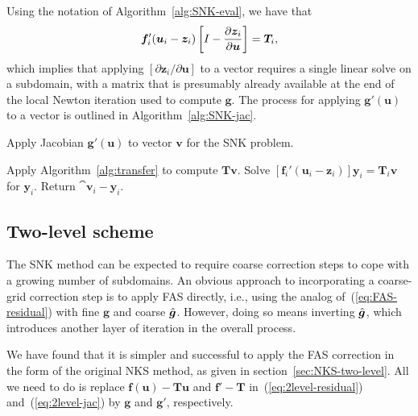 Using the notation of Algorithm~\ref{alg:SNK-eval}, we have that
\[
  \bm{f}_i'(\bm{u}_i-\bm{z}_i) \left[I - \frac{\partial \bm{z}_i}{\partial \bm{u}} \right] = \bm{T}_i,
\]
which implies that applying $[\partial \bm{z}_i/\partial \bm{u}]$ to a vector requires a single linear solve on a subdomain, with a matrix that is presumably already available at the end of the local Newton iteration used to compute $\bm{g}$. The process for applying $\bm{g}'(\bm{u})$ to a vector is outlined in Algorithm~\ref{alg:SNK-jac}. 
\begin{algorithm}
  \caption{Apply Jacobian $\bm{g}'(\bm{u})$ to vector $\bm{v}$ for the SNK problem.}
  \label{alg:SNK-jac}
  \begin{algorithmic}
    \STATE Apply Algorithm~\ref{alg:transfer} to compute $\bm{T}\bm{v}$.
    \STATE Solve $[\bm{f}_i'(\bm{u}_i-\bm{z}_i)] \bm{y}_i = \bm{T}_i\bm{v}$ for $\bm{y}_i$.
    \ENDFOR
    \STATE Return $\cat{\bm{v}_i - \bm{y}_i}$. 
  \end{algorithmic}
\end{algorithm}



\subsection{Two-level scheme}
\label{sec:SNK-two-level}

The SNK method can be expected to require coarse correction steps to cope with a growing number of subdomains. An obvious approach to incorporating a coarse-grid correction step is to apply FAS directly, i.e., using the analog of~(\ref{eq:FAS-residual}) with fine $\bm{g}$ and coarse $\hat{\bm{g}}$. However, doing so means inverting $\hat{\bm{g}}$, which introduces another layer of iteration in the overall process.

We have found that it is simpler and successful to apply the FAS correction in the form of the original NKS method, as given in section~\ref{sec:NKS-two-level}. All we need to do is replace $\bm{f}(\bm{u})-\bm{T}\bm{u}$ and $\bm{f}'-\bm{T}$ in~(\ref{eq:2level-residual}) and~(\ref{eq:2level-jac})  by $\bm{g}$ and $\bm{g}'$, respectively. 



